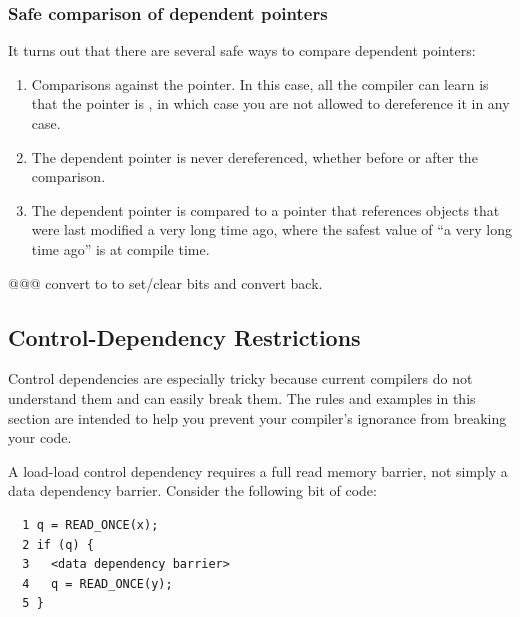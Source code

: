 
\subsubsection{Safe comparison of dependent pointers}
It turns out that there are several safe ways to compare dependent
pointers:

\begin{enumerate}
\item	Comparisons against the  pointer.
	In this case, all the compiler can learn is that the pointer
	is , in which case you are not allowed to
	dereference it in any case.
\item	The dependent pointer is never dereferenced, whether before or
	after the comparison.
\item	The dependent pointer is compared to a pointer that references
	objects that were last modified a very long time ago, where
	the safest value of ``a very long time ago'' is at compile time.
\end{enumerate}

@@@ convert to  to set/clear bits and convert back.


\subsection{Control-Dependency Restrictions}
\label{sec:memorder:Control-Dependency Restrictions}

Control dependencies are especially tricky because current compilers
do not understand them and can easily break them.
The rules and examples in this section are intended to help you
prevent your compiler's ignorance from breaking your code.

A load-load control dependency requires a full read memory barrier,
not simply a data dependency barrier.
Consider the following bit of code:

\vspace{5pt}
\begin{minipage}[t]{\columnwidth}
\scriptsize
\begin{verbatim}
  1 q = READ_ONCE(x);
  2 if (q) {
  3   <data dependency barrier>
  4   q = READ_ONCE(y);
  5 }
\end{verbatim}
\end{minipage}
\vspace{5pt}

